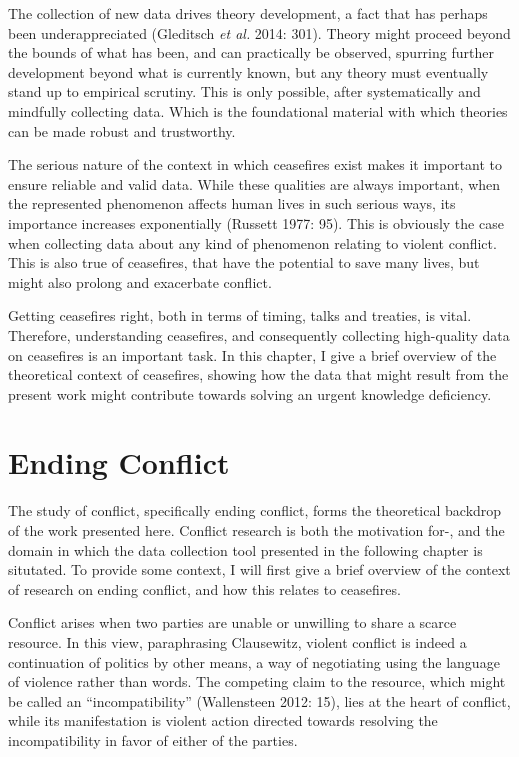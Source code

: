 \documentclass[12pt,twoside]{reedthesis}
\begin{document}
The collection of new data drives theory development, a fact that has
perhaps been underappreciated (Gleditsch \emph{et al.} 2014: 301).
Theory might proceed beyond the bounds of what has been, and can
practically be observed, spurring further development beyond what is
currently known, but any theory must eventually stand up to empirical
scrutiny. This is only possible, after systematically and mindfully
collecting data. Which is the foundational material with which theories
can be made robust and trustworthy.

The serious nature of the context in which ceasefires exist makes it
important to ensure reliable and valid data. While these qualities are
always important, when the represented phenomenon affects human lives in
such serious ways, its importance increases exponentially (Russett 1977:
95). This is obviously the case when collecting data about any kind of
phenomenon relating to violent conflict. This is also true of
ceasefires, that have the potential to save many lives, but might also
prolong and exacerbate conflict.

Getting ceasefires right, both in terms of timing, talks and treaties,
is vital. Therefore, understanding ceasefires, and consequently
collecting high-quality data on ceasefires is an important task. In this
chapter, I give a brief overview of the theoretical context of
ceasefires, showing how the data that might result from the present work
might contribute towards solving an urgent knowledge deficiency.

\section{Ending Conflict}\label{ending-conflict}

The study of conflict, specifically ending conflict, forms the
theoretical backdrop of the work presented here. Conflict research is
both the motivation for-, and the domain in which the data collection
tool presented in the following chapter is situtated. To provide some
context, I will first give a brief overview of the context of research
on ending conflict, and how this relates to ceasefires.

Conflict arises when two parties are unable or unwilling to share a
scarce resource. In this view, paraphrasing Clausewitz, violent conflict
is indeed a continuation of politics by other means, a way of
negotiating using the language of violence rather than words. The
competing claim to the resource, which might be called an
``incompatibility'' (Wallensteen 2012: 15), lies at the heart of
conflict, while its manifestation is violent action directed towards
resolving the incompatibility in favor of either of the parties.
\end{document}
